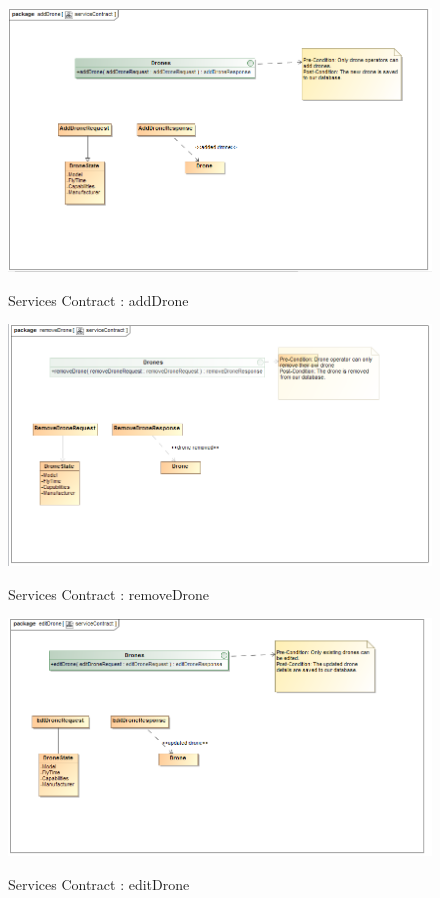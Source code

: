 \documentclass{article}
\begin{document}
		\begin{figure}[H]
			\includegraphics[width=\textwidth]{SC_add.png}  \\
			\caption{Services Contract : addDrone}
		\end{figure}
		\begin{figure}[H]
			\includegraphics[width=\textwidth]{sc_delete.png}  \\
			\caption{Services Contract : removeDrone}
		\end{figure}
		\begin{figure}[H]
			\includegraphics[width=\textwidth]{sc_edit.png}  \\
			\caption{Services Contract : editDrone}
		\end{figure}
\end{document}

